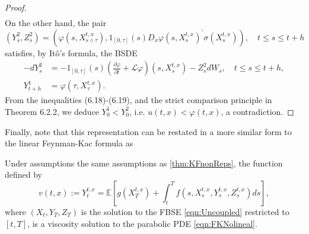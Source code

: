 \begin{proof}
$$\begin{aligned}
\end{aligned}
$$
On the other hand, the pair
$$
\left(Y_s^2, Z_s^2\right)=\left(\varphi\left(s, X_{s \wedge \tau}^{t, x}\right), 1_{[0, \tau]}(s) D_x \varphi\left(s, X_s^{t, x}\right)^{\prime} \sigma\left(X_s^{t, x}\right)\right), \quad t \leq s \leq t+h
$$
satisfies, by Itô's formula, the BSDE
$$
\begin{aligned}
	-d Y_s^2 & =-1_{[0, \tau]}(s)\left(\frac{\partial \varphi}{\partial t}+\mathcal{L} \varphi\right)\left(s, X_s^{t, x}\right)-Z_s^2 d W_s, \quad t \leq s \leq t+h, \\
	Y_{t+h}^1 & =\varphi\left(\tau, X_\tau^{t, x}\right) .
\end{aligned}
$$
From the inequalities (6.18)-(6.19), and the strict comparison principle in Theorem 6.2.2, we deduce $Y_0^1<Y_0^2$, i.e. $u(t, x)<\varphi(t, x)$, a contradiction.
\end{proof}
Finally, note that this representation can be restated in a more similar form to the linear Feynman-Kac formula as
\begin{theorem}[]
	\label{thm:NonlinealFK}
	Under assumptions the same assumptions as \ref{thm:KFnonReps}, the function defined by 
	\begin{equation}
		v(t, x):=Y_t^{t, x}=\mathbb{E}\left[g\left(X_T^{t, x}\right)+\int_t^T f\left(s, X_s^{t, x}, Y_s^{t, x}, Z_s^{t, x}\right) d s\right],
	\end{equation}
where $(X_t,Y_T,Z_T)$ is the solution to the FBSE \ref{eqn:Uncoupled} restricted to $[t,T]$, is a viscosity solution to the parabolic PDE \eqref{eqn:FKNolineal}.
\end{theorem}

